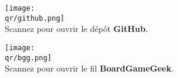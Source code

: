 \bigbreak

\begin{multicols}{2}
\centering
\texttt{[image: \\qr/github.png]}\\
Scannez pour ouvrir le dépôt \textbf{GitHub}.

\columnbreak

\texttt{[image: \\qr/bgg.png]}\\
Scannez pour ouvrir le fil \textbf{BoardGameGeek}.
\end{multicols}
